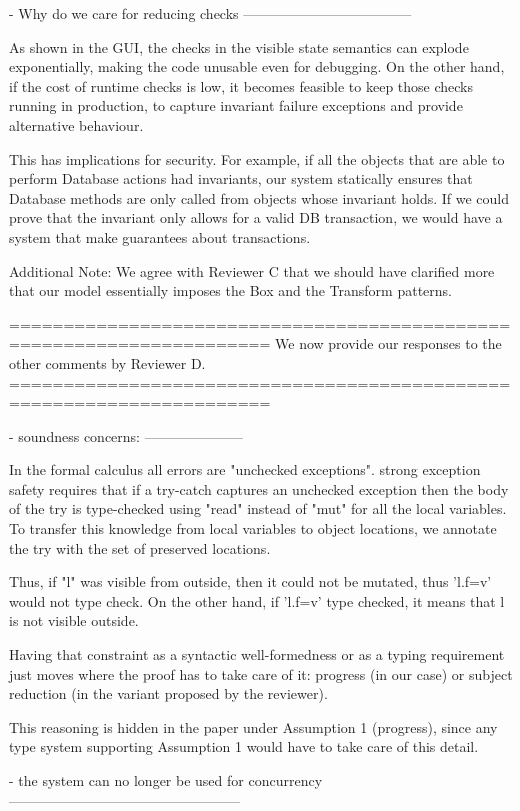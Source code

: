 - Why do we care for reducing checks
------------------------------------

As shown in the GUI, the checks in the visible state semantics can explode
exponentially, making the code unusable even for debugging.
On the other hand, if the cost of runtime checks is low,
it becomes feasible to keep those checks running in production,
to capture invariant failure exceptions and provide alternative behaviour.

This has implications for security.
For example, if all the objects that are able to perform Database actions had invariants,
our system statically ensures that Database methods are only called from objects whose invariant holds.
If we could prove that the invariant only allows for a valid DB transaction, we would have a system
that make guarantees about transactions.

Additional Note: We agree with Reviewer C that we should have clarified more that our model essentially imposes the Box and the Transform patterns.


======================================================================
We now provide our responses to the other comments by Reviewer D.
======================================================================

- soundness concerns:
---------------------

In the formal calculus all errors are "unchecked exceptions".
strong exception safety requires that if a try-catch captures an unchecked exception then the body of the try
is type-checked using "read" instead of "mut" for all the local variables.
To transfer this knowledge from local variables to object locations, we annotate the try with
the set of preserved locations.

Thus, if "l" was visible from outside, then it could not be mutated, thus 'l.f=v' would not type check.
On the other hand, if 'l.f=v' type checked, it means that l is not visible outside.

Having that constraint as a syntactic well-formedness or as a typing requirement just moves 
where the proof has to take care of it: progress (in our case) or subject reduction
(in the variant proposed by the reviewer).

This reasoning is hidden in the paper under Assumption 1 (progress), since any type system
supporting Assumption 1 would have to take care of this detail.

- the system can no longer be used for concurrency
--------------------------------------------------

